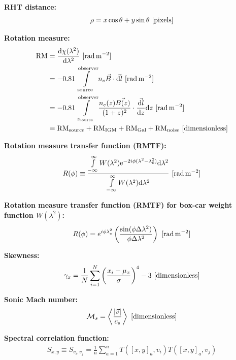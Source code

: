 \documentclass[a4paper,10pt]{article}
\begin{document}
{\noindent}\textbf{RHT distance:}
\begin{align*}
    \rho = x\cos\theta+y\sin\theta ~ [{\rm pixels}]
\end{align*}

{\noindent}\textbf{Rotation measure:}
\begin{align*}
{\rm RM} &= \dfrac{\mathrm{d}\chi(\lambda^2)}{\mathrm{d}\lambda^2} ~ [{\rm rad\,m^{-2}}] \\
               & = -0.81 \int\limits_\mathrm{source}^\mathrm{observer} n_e \vec{B}\cdot\vec{{\rm d}l} ~ [{\rm rad\,m^{-2}}] \\
               &= -0.81 \int\limits_{z_\mathrm{source}}^\mathrm{observer} \frac{n_e(z) \vec{B(z)}}{(1+z)^2} \cdot \frac{\vec{{\rm d}l}}{{\rm d}z} {\rm d}z ~ [{\rm rad\,m^{-2}}] \\
               &= {\rm RM}_{\rm source} + {\rm RM}_{\rm IGM} + {\rm RM}_{\rm Gal} + {\rm RM}_{\rm noise} ~ [{\rm dimensionless}]
\end{align*}

{\noindent}\textbf{Rotation measure transfer function (RMTF):}
\begin{align*}
R(\phi) \equiv \dfrac{\int\limits_{-\infty}^\infty W(\lambda^2)\mathrm{e}^{-2i\phi(\lambda^2-\lambda_0^2)}\mathrm{d}\lambda^2}{\int\limits_{-\infty}^\infty W(\lambda^2)\mathrm{d}\lambda^2} ~ [{\rm rad\,m^{-2}}]
\end{align*}

{\noindent}\textbf{Rotation measure transfer function (RMTF) for box-car weight function $W(\lambda^2)$:}
\begin{align*}
    R(\phi) = e^{i\phi\lambda_c^2}\left(\dfrac{\sin(\phi\Delta\lambda^2)}{\phi\Delta\lambda^2}\right) ~ [{\rm rad\,m^{-2}}]
\end{align*}

{\noindent}\textbf{Skewness:}
\begin{align*}
    \gamma_x = \frac{1}{N} \sum_{i=1}^N \left(\frac{x_i-\mu_x}{\sigma}\right)^4 -3 ~ [{\rm dimensionless}]
\end{align*}

{\noindent}\textbf{Sonic Mach number:}
\begin{align*}
    \mathcal{M}_s = \left\langle\frac{\lvert\vec{v}\rvert}{c_s}\right\rangle ~ [{\rm dimensionless}]
\end{align*}

{\noindent}\textbf{Spectral correlation function:}
\begin{align*}
    S_{x,y} \equiv S_{v_i,v_j} = \frac{1}{n}\sum_{a=1}^n T([x,y]_a,v_i)T([x,y]_a,v_j)
\end{align*}
\end{document}
